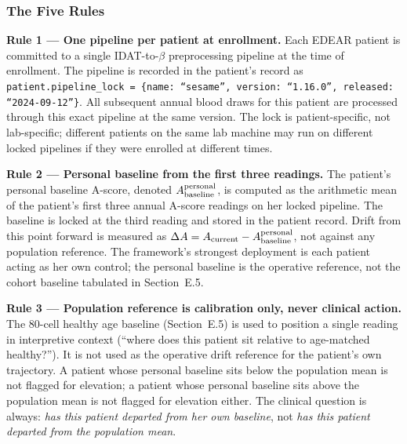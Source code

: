 \documentclass[12pt,a4paper]{article}
\begin{document}
\subsubsection{The Five Rules}

\textbf{Rule 1 --- One pipeline per patient at enrollment.} Each
EDEAR patient is committed to a single IDAT-to-$\beta$ preprocessing
pipeline at the time of enrollment. The pipeline is recorded in the
patient's record as
\texttt{patient.pipeline\_lock = \{name: ``sesame'', version:
``1.16.0'', released: ``2024-09-12''\}}. All subsequent annual blood
draws for this patient are processed through this exact pipeline at
the same version. The lock is patient-specific, not lab-specific;
different patients on the same lab machine may run on different
locked pipelines if they were enrolled at different times.

\textbf{Rule 2 --- Personal baseline from the first three readings.}
The patient's personal baseline A-score, denoted
$A_{\rm baseline}^{\rm personal}$, is computed as the arithmetic mean
of the patient's first three annual A-score readings on her locked
pipeline. The baseline is locked at the third reading and stored in
the patient record. Drift from this point forward is measured as
$\Delta A = A_{\rm current} - A_{\rm baseline}^{\rm personal}$, not
against any population reference. The framework's strongest deployment
is each patient acting as her own control; the personal baseline is
the operative reference, not the cohort baseline tabulated in
Section~E.5.

\textbf{Rule 3 --- Population reference is calibration only, never
clinical action.} The 80-cell healthy age baseline (Section~E.5) is
used to position a single reading in interpretive context (``where
does this patient sit relative to age-matched healthy?''). It is not
used as the operative drift reference for the patient's own
trajectory. A patient whose personal baseline sits below the
population mean is not flagged for elevation; a patient whose personal
baseline sits above the population mean is not flagged for elevation
either. The clinical question is always: \emph{has this patient
departed from her own baseline}, not \emph{has this patient departed
from the population mean}.
\end{document}
